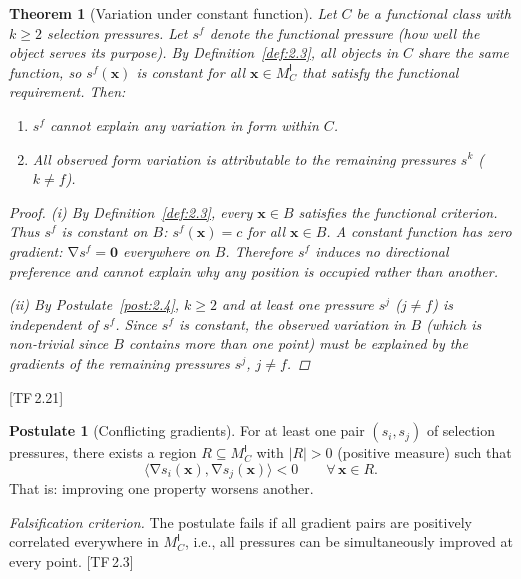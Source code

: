 \documentclass[10pt]{article}
\theoremstyle{definition}
\newtheorem{postulate}[definition]{Postulate}
\theoremstyle{plain}
\newtheorem{theorem}[definition]{Theorem}
\theoremstyle{remark}
\newcommand{\MC}{M^{\mathsf{I}}_C}          %
\newcommand{\inner}[2]{\langle #1, #2 \rangle}
\newcommand{\abs}[1]{\lvert #1 \rvert}
\DeclareMathOperator{\grad}{\nabla}
\newcommand{\TF}[1]{\textnormal{[TF\,#1]}}  %
\begin{document}
\begin{theorem}[Variation under constant function]\label{thm:2.5}
Let $C$ be a functional class with $k \geq 2$ selection pressures.
Let $s^f$ denote the functional pressure (how well the object serves its
purpose). By Definition~\ref{def:2.3}, all objects in $C$ share the
same function, so $s^f(\bm{x})$ is constant for all
$\bm{x} \in \MC$ that satisfy the functional requirement. Then:
\begin{enumerate}[label=(\roman*),nosep]
  \item $s^f$ cannot explain any variation in form within $C$.
  \item All observed form variation is attributable to the remaining
    pressures $s^k$ ($k \neq f$).
\end{enumerate}

\begin{proof}
\textit{(i)}\; By Definition~\ref{def:2.3}, every $\bm{x} \in B$
satisfies the functional criterion. Thus $s^f$ is constant on $B$:
$s^f(\bm{x}) = c$ for all $\bm{x} \in B$. A constant function has
zero gradient: $\grad s^f = \bm{0}$ everywhere on $B$. Therefore $s^f$
induces no directional preference and cannot explain why any position is
occupied rather than another.

\textit{(ii)}\; By Postulate~\ref{post:2.4}, $k \geq 2$ and at least one
pressure $s^j$ ($j \neq f$) is independent of $s^f$. Since $s^f$ is
constant, the observed variation in $B$ (which is non-trivial since
$B$ contains more than one point) must be explained by the gradients of
the remaining pressures $s^j$, $j \neq f$. \qedhere
\end{proof}
\end{theorem}

\TF{2.21}

\begin{postulate}[Conflicting gradients]\label{post:2.6}
For at least one pair $(s_i, s_j)$ of selection pressures, there exists
a region $R \subseteq \MC$ with $\abs{R} > 0$ (positive measure) such
that
\[
  \inner{\grad s_i(\bm{x})}{\grad s_j(\bm{x})} < 0
  \qquad \forall\, \bm{x} \in R.
\]
That is: improving one property worsens another.

\medskip\noindent
\textit{Falsification criterion.}
The postulate fails if all gradient pairs are positively correlated
everywhere in $\MC$, i.e., all pressures can be simultaneously improved
at every point. \TF{2.3}
\end{postulate}
\end{document}

